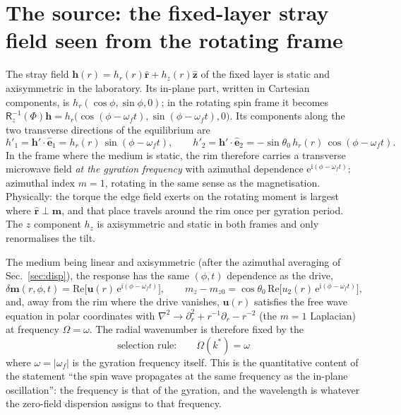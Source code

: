 \documentclass[11pt,a4paper]{article}
\newcommand{\vect}[1]{\mathbf{#1}}
\newcommand{\uv}[1]{\hat{\mathbf{#1}}}
\newcommand{\ee}{\mathrm{e}}
\newcommand{\ii}{\mathrm{i}}
\begin{document}
\section{The source: the fixed-layer stray field seen from the rotating frame}
\label{sec:source}

The stray field $\vect h(r)=h_r(r)\uv r+h_z(r)\uv z$ of the fixed layer is static and axisymmetric in the
laboratory.  Its in-plane part, written in Cartesian components, is $h_r(\cos\phi,\sin\phi,0)$; in the rotating
spin frame it becomes $\mathsf R_z^{-1}(\Phi)\vect h=h_r\big(\cos(\phi-\omega_f t),\sin(\phi-\omega_f t),0\big)$.
Its components along the two transverse directions of the equilibrium are
\begin{equation}
h'_1=\vect h'\cdot\uv e_1=h_r(r)\,\sin(\phi-\omega_f t),\qquad
h'_2=\vect h'\cdot\uv e_2=-\sin\theta_0\,h_r(r)\,\cos(\phi-\omega_f t).
\label{eq:drive}
\end{equation}
In the frame where the medium is static, the rim therefore carries a transverse microwave field
\emph{at the gyration frequency} with azimuthal dependence $\ee^{\ii(\phi-\omega_f t)}$: azimuthal index $m=1$,
rotating in the same sense as the magnetisation.  Physically: the torque the edge field exerts on the rotating
moment is largest where $\uv r\perp\vect m$, and that place travels around the rim once per gyration period.
The $z$ component $h_z$ is axisymmetric and static in both frames and only renormalises the tilt.

The medium being linear and axisymmetric (after the azimuthal averaging of Sec.~\ref{sec:disp}), the response has
the same $(\phi,t)$ dependence as the drive,
\begin{equation}
\delta\vect m(r,\phi,t)=\mathrm{Re}\big[\vect u(r)\,\ee^{\ii(\phi-\omega_f t)}\big],\qquad
m_z-m_{z0}=\cos\theta_0\,\mathrm{Re}\big[u_2(r)\,\ee^{\ii(\phi-\omega_f t)}\big],
\end{equation}
and, away from the rim where the drive vanishes, $\vect u(r)$ satisfies the free wave equation in polar
coordinates with $\nabla^2\to\partial_r^2+r^{-1}\partial_r-r^{-2}$ (the $m=1$ Laplacian) at frequency
$\Omega=\omega$.  The radial wavenumber is therefore fixed by the
\begin{equation}
\boxed{\ \text{selection rule:}\qquad \Omega(k^\ast)=\omega\ }
\label{eq:selection}
\end{equation}
where $\omega=|\omega_f|$ is the gyration frequency itself.  This is the quantitative content of the statement
``the spin wave propagates at the same frequency as the in-plane oscillation'': the frequency is that of the
gyration, and the wavelength is whatever the zero-field dispersion assigns to that frequency.
\end{document}
